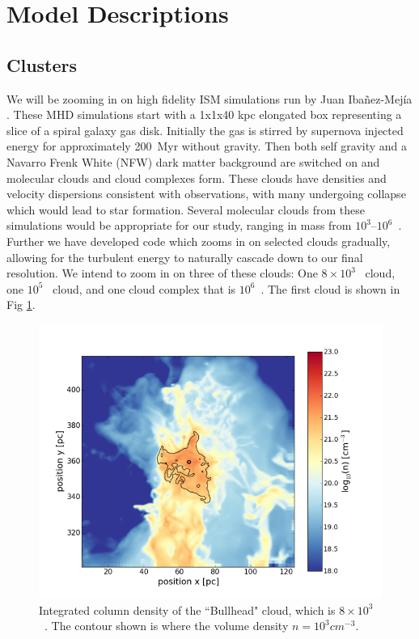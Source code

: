 \documentclass[11pt]{article}
\begin{document}
\section{Model Descriptions}
\subsection{Clusters}

We will be zooming in on high fidelity ISM simulations run by Juan Iba\~{n}ez-Mej\'{i}a \citep{ibanez-mejia_gravitational_2015}. These MHD simulations start with a 1x1x40 \si{kpc} elongated box representing a slice of a spiral galaxy gas disk. Initially the gas is stirred by supernova injected energy for approximately 200~Myr without gravity. Then both self gravity and a Navarro Frenk White (NFW) dark matter background are switched on and molecular clouds and cloud complexes form. These clouds have densities and velocity dispersions consistent with observations, with many undergoing collapse which would lead to star formation. Several molecular clouds from these simulations would be appropriate for our study, ranging in mass from %
$10^3$--$10^6$~\msun.  Further we have developed code which zooms in on selected clouds gradually, allowing for the turbulent energy to naturally cascade down to our final resolution. We intend to zoom in on three of these clouds: One $8 \times 10^3$~{\msun} cloud, one $10^5$~{\msun} cloud, and one cloud complex that is $10^6$~{\msun}. The first cloud is shown in Fig \ref{fig:bullhead}.

\begin{figure}
\centering
\includegraphics[width=1.0\linewidth]{bullhead_mod}
\caption{Integrated column density of the ``Bullhead" cloud, which is $8 \times 10^3$~{\msun}. The contour shown is where the volume density $n=10^3 \si{cm^{-3}}$.}
\label{fig:bullhead}
\end{figure}
\end{document}
